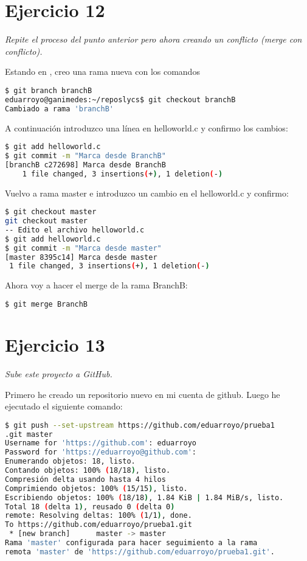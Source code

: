 \section{Ejercicio 12}
\begin{center}
    \parbox{12cm}{\justify\textit{
        Repite el proceso del punto anterior pero ahora creando un conflicto (merge con conflicto).
    }}
\end{center}
Estando en , creo una rama nueva con los comandos
\begin{lstlisting}[xleftmargin=.16\textwidth,language=bash]
$ git branch branchB
eduarroyo@ganimedes:~/reposlycs$ git checkout branchB
Cambiado a rama 'branchB'
\end{lstlisting}
A continuación introduzco una línea en helloworld.c y confirmo los cambios:

\begin{lstlisting}[xleftmargin=.16\textwidth,language=bash]
$ git add helloworld.c 
$ git commit -m "Marca desde BranchB"
[branchB c272698] Marca desde BranchB
    1 file changed, 3 insertions(+), 1 deletion(-)
\end{lstlisting}

Vuelvo a rama master e introduzco un cambio en el helloworld.c y confirmo:
\begin{lstlisting}[xleftmargin=.16\textwidth,language=bash]
$ git checkout master
git checkout master
-- Edito el archivo helloworld.c
$ git add helloworld.c
$ git commit -m "Marca desde master"
[master 8395c14] Marca desde master
 1 file changed, 3 insertions(+), 1 deletion(-)
\end{lstlisting}

Ahora voy a hacer el merge de la rama BranchB:
\begin{lstlisting}[xleftmargin=.16\textwidth,language=bash]
$ git merge BranchB
\end{lstlisting}

\section{Ejercicio 13}
\begin{center}
    \parbox{12cm}{\justify\textit{
        Sube este proyecto a GitHub.
    }}
\end{center}
Primero he creado un repositorio nuevo en mi cuenta de github. Luego he ejecutado el siguiente comando:

\begin{lstlisting}[xleftmargin=.16\textwidth,language=bash]
$ git push --set-upstream https://github.com/eduarroyo/prueba1
.git master
Username for 'https://github.com': eduarroyo
Password for 'https://eduarroyo@github.com': 
Enumerando objetos: 18, listo.
Contando objetos: 100% (18/18), listo.
Compresión delta usando hasta 4 hilos
Comprimiendo objetos: 100% (15/15), listo.
Escribiendo objetos: 100% (18/18), 1.84 KiB | 1.84 MiB/s, listo.
Total 18 (delta 1), reusado 0 (delta 0)
remote: Resolving deltas: 100% (1/1), done.
To https://github.com/eduarroyo/prueba1.git
 * [new branch]      master -> master
Rama 'master' configurada para hacer seguimiento a la rama 
remota 'master' de 'https://github.com/eduarroyo/prueba1.git'.
\end{lstlisting}

